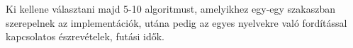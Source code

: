 
Ki kellene választani majd 5-10 algoritmust, amelyikhez egy-egy szakaszban szerepelnek az implementációk, utána pedig az egyes nyelvekre való fordítással kapcsolatos észrevételek, futási idők.
